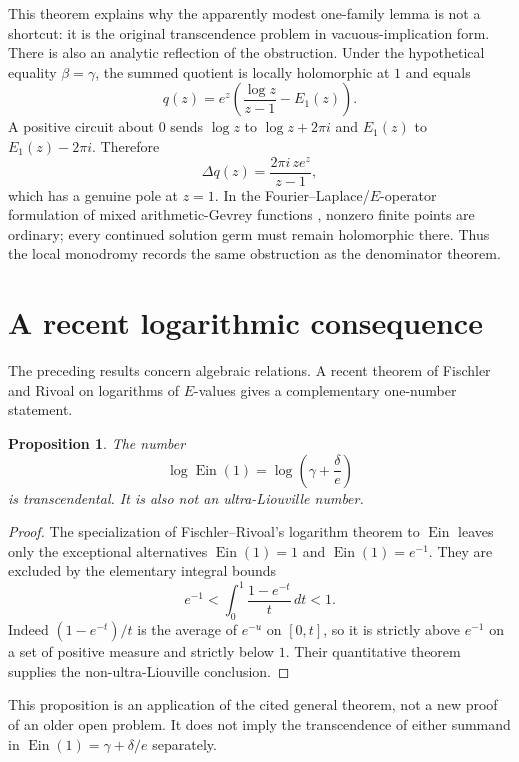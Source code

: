 \documentclass[11pt]{article}
\newtheorem{proposition}[theorem]{Proposition}
\theoremstyle{definition}
\theoremstyle{remark}
\newcommand{\Ein}{\operatorname{Ein}}
\begin{document}
This theorem explains why the apparently modest one-family lemma is not a
shortcut: it is the original transcendence problem in vacuous-implication
form.  There is also an analytic reflection of the obstruction.  Under the
hypothetical equality \(\beta=\gamma\), the summed quotient is locally
holomorphic at \(1\) and equals
\begin{equation}\label{eq:q-monodromy}
 q(z)=e^z\left(\frac{\log z}{z-1}-E_1(z)\right).
\end{equation}
A positive circuit about \(0\) sends \(\log z\) to \(\log z+2\pi i\) and
\(E_1(z)\) to \(E_1(z)-2\pi i\).  Therefore
\[
 \Delta q(z)=\frac{2\pi i\,ze^z}{z-1},
\]
which has a genuine pole at \(z=1\).  In the Fourier--Laplace/\(E\)-operator
formulation of mixed arithmetic-Gevrey functions
\cite{Andre2000,FR2024ED}, nonzero finite points are ordinary; every
continued solution germ must remain holomorphic there.  Thus
the local monodromy records the same obstruction as the denominator theorem.



\section{A recent logarithmic consequence}\label{sec:log}

The preceding results concern algebraic relations.  A recent theorem of
Fischler and Rivoal on logarithms of \(E\)-values \cite{FRlog} gives a complementary
one-number statement.

\begin{proposition}\label{prop:log-ein}
The number
\[
 \log\Ein(1)=\log\left(\gamma+\frac{\delta}{e}\right)
\]
is transcendental.  It is also not an ultra-Liouville number.
\end{proposition}

\begin{proof}
The specialization of Fischler--Rivoal's logarithm theorem \cite{FRlog} to \(\Ein\) leaves
only the exceptional alternatives \(\Ein(1)=1\) and \(\Ein(1)=e^{-1}\).
They are excluded by the elementary integral bounds
\[
 e^{-1}
 <\int_0^1\frac{1-e^{-t}}{t}\,dt
 <1.
\]
Indeed \((1-e^{-t})/t\) is the average of \(e^{-u}\) on \([0,t]\), so it is
strictly above \(e^{-1}\) on a set of positive measure and strictly below
\(1\).  Their quantitative theorem supplies the non-ultra-Liouville
conclusion.
\end{proof}

This proposition is an application of the cited general theorem, not a new
proof of an older open problem.  It does not imply the transcendence of either
summand in \(\Ein(1)=\gamma+\delta/e\) separately.
\end{document}
